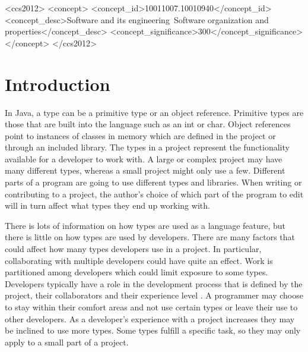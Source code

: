 \documentclass{sig-alternate-05-2015}
\begin{document}
%
%

\begin{CCSXML}
<ccs2012>
<concept>
<concept_id>10011007.10010940</concept_id>
<concept_desc>Software and its engineering~Software organization and properties</concept_desc>
<concept_significance>300</concept_significance>
</concept>
</ccs2012>
\end{CCSXML}



%
%

%
%
\printccsdesc



\section{Introduction}
In Java, a type can be a primitive type or an object reference. Primitive types are those that are built into the language such as an int or char. Object references point to instances of classes in memory which are defined in the project or through an included library. The types in a project represent the functionality available for a developer to work with. A large or complex project may have many different types, whereas a small project might only use a few. Different parts of a program are going to use different types and libraries. When writing or contributing to a project, the author's choice of which part of the program to edit will in turn affect what types they end up working with.
 
There is lots of information on how types are used as a language feature, but there is little on how types are used by developers. There are many factors that could affect how many types developers use in a project. In particular, collaborating with multiple developers could have quite an effect. Work is partitioned among developers which could limit exposure to some types. Developers typically have a role in the development process that is defined by the project, their collaborators and their experience level \cite{Patrick:Wagstrom:2012}. A programmer may choose to stay within their comfort areas and not use certain types or leave their use to other developers. As a developer's experience with a project increases they may be inclined to use more types. Some types fulfill a specific task, so they may only apply to a small part of a project. 
\end{document}
